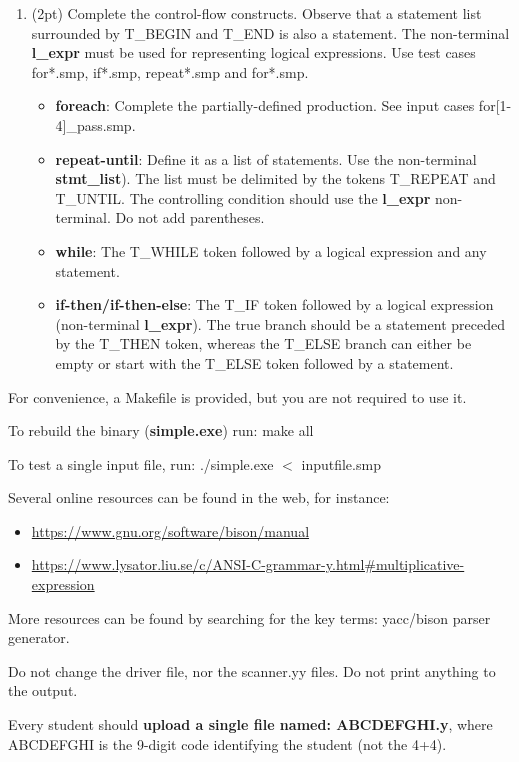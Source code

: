 \documentclass[letter,10pt]{article}
\begin{document}
\begin{enumerate}
\item (2pt)
Complete the control-flow constructs. Observe that a statement list surrounded by T\_BEGIN and T\_END is also a statement. The non-terminal {\bf l\_expr} must be
used for representing logical expressions. Use test cases for*.smp, if*.smp, repeat*.smp and for*.smp.

  \begin{itemize}
  \item {\bf foreach}: Complete the partially-defined production. See input cases for[1-4]\_pass.smp.
  \item {\bf repeat-until}: 
        Define it  as a list of statements. Use the non-terminal {\bf stmt\_list}). The list must be  delimited by the tokens T\_REPEAT and T\_UNTIL. 
        The controlling condition should use the {\bf l\_expr} non-terminal. Do not add parentheses.
  \item {\bf while}:
        The T\_WHILE token followed by a logical expression and any statement.
  \item {\bf if-then/if-then-else}:
        The T\_IF token followed by a logical expression (non-terminal {\bf l\_expr}). The true branch should be a statement preceded by the T\_THEN token,
        whereas the T\_ELSE branch can either be empty or start with the T\_ELSE token followed by a statement.
  \end{itemize}

\end{enumerate}

For convenience, a Makefile is provided, but you are not required to use it.

To rebuild the binary ({\bf simple.exe}) run: make all

To test a single input file, run: ./simple.exe $<$ inputfile.smp

Several online resources can be found in the web, for instance:
\begin{itemize}
\item
\url{https://www.gnu.org/software/bison/manual}
\item
\url{https://www.lysator.liu.se/c/ANSI-C-grammar-y.html#multiplicative-expression}
\end{itemize}

More resources can be found by searching for the key terms: yacc/bison parser generator.

Do not change the driver file, nor the scanner.yy files. Do not print anything to the output.

Every student should {\bf upload a single file named: ABCDEFGHI.y}, where ABCDEFGHI is the 9-digit code identifying the student (not the 4+4).
\end{document}
